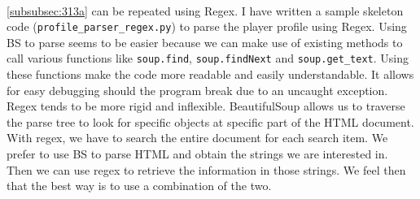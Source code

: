 \paragraph{}\ref{subsubsec:313a} can be repeated using Regex. I have written a sample skeleton code (\verb|profile_parser_regex.py|)  to parse the player profile using Regex. Using BS to parse seems to be easier because we can make use of existing methods to call various functions like \verb|soup.find|, \verb|soup.findNext| and \verb|soup.get_text|. Using these functions make the code more readable and easily understandable. It allows for easy debugging should the program break due to an uncaught exception. Regex tends to be more rigid and inflexible. BeautifulSoup allows us to traverse the parse tree to look for specific objects at specific part of the HTML document. With regex, we have to search the entire document for each search item. 
We prefer to use BS to parse HTML and obtain the strings we are interested in. Then we can use regex to retrieve the information in those strings. We feel then that the best way is to use a combination of the two.
